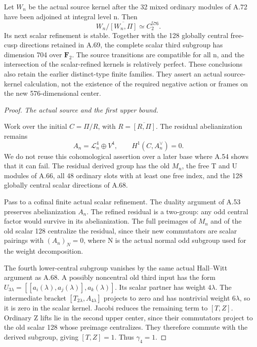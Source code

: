 Let \(W_n\) be the actual source kernel after the 32 mixed ordinary
modules of A.72 have been adjoined at integral level n. Then
\[
 W_n/\overline{[W_n,\Pi]}\simeq C_2^{576}.
 \tag{A.73.1}
\]
Its next scalar refinement is stable. Together with the 128 globally
central free-cusp directions retained in A.69, the complete scalar
third subgroup has dimension 704 over \(\mathbf F_2\).
The source transitions are compatible for all n, and the intersection
of the scalar-refined kernels is relatively perfect. These conclusions
also retain the earlier distinct-type finite families. They assert an
actual source-kernel calculation, not the existence of the required
negative action or frames on the new 576-dimensional center.

\begin{proof}
\emph{The actual source and the first upper bound.}\par
Work over the initial \(C=\Pi/R\), with \(R=\overline{[R,\Pi]}\).
The residual abelianization remains
\[
 A_n=\mathcal L_n^4\oplus V^4,
 \qquad H^1(C,A_n^\vee)=0.
 \tag{A.73.2}
\]
We do not reuse this cohomological assertion over a later base where
A.54 shows that it can fail. The residual derived group has the old
\(M_n\), the free T and U modules of A.66, all 48 ordinary slots with
at least one free index, and the 128 globally central scalar
directions of A.68.

Pass to a cofinal finite actual scalar refinement. The duality
argument of A.53 preserves abelianization \(A_n\). The refined
residual is a two-group: any odd central factor would survive in
its abelianization. The full preimages of \(M_n\) and of the old
scalar 128 centralize the residual, since their new commutators
are scalar pairings with \((A_n)_N=0\), where N is the actual
normal odd subgroup used for the weight decomposition.

The fourth lower-central subgroup vanishes by the same actual
Hall--Witt argument as A.68. A possibly noncentral old third input
has the form
\(U_{3\lambda}=[[a_i(\lambda),a_j(\lambda)],a_k(\lambda)]\).
Its scalar partner has weight \(4\lambda\). The intermediate
bracket \([T_{2\lambda},A_{4\lambda}]\) projects to zero and
has nontrivial weight \(6\lambda\), so it is zero in the scalar
kernel. Jacobi reduces the remaining term to \([T,Z]\). Ordinary
Z lifts lie in the second upper center, since their commutators
project to the old scalar 128 whose preimage centralizes. They
therefore commute with the derived subgroup, giving \([T,Z]=1\).
Thus \(\gamma_4=1\).


\end{proof}
